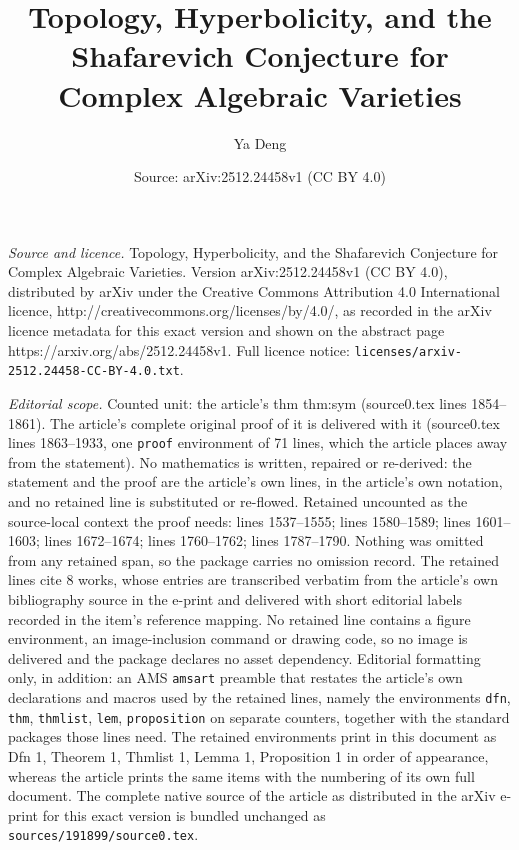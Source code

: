 \documentclass[10pt,a4paper]{amsart}
\title{Topology, Hyperbolicity, and the Shafarevich Conjecture for Complex Algebraic Varieties}
\author{Ya Deng}
\date{Source: arXiv:2512.24458v1 (CC BY 4.0)}
\begin{document}
\maketitle

\noindent\emph{Source and licence.} Topology, Hyperbolicity, and the Shafarevich Conjecture for Complex Algebraic Varieties. Version arXiv:2512.24458v1 (CC BY 4.0), distributed by arXiv under the Creative Commons Attribution 4.0 International licence, http://creativecommons.org/licenses/by/4.0/, as recorded in the arXiv licence metadata for this exact version and shown on the abstract page https://arxiv.org/abs/2512.24458v1. Full licence notice: \texttt{licenses/arxiv-2512.24458-CC-BY-4.0.txt}.\par\smallskip

\noindent\textit{Editorial scope.} Counted unit: the article's thm thm:sym (source0.tex lines 1854--1861). The article's complete original proof of it is delivered with it (source0.tex lines 1863--1933, one \texttt{proof} environment of 71 lines, which the article places away from the statement). No mathematics is written, repaired or re-derived: the statement and the proof are the article's own lines, in the article's own notation, and no retained line is substituted or re-flowed.  Retained uncounted as the source-local context the proof needs: lines 1537--1555; lines 1580--1589; lines 1601--1603; lines 1672--1674; lines 1760--1762; lines 1787--1790.  Nothing was omitted from any retained span, so the package carries no omission record.  The retained lines cite 8 works, whose entries are transcribed verbatim from the article's own bibliography source in the e-print and delivered with short editorial labels recorded in the item's reference mapping.  No retained line contains a figure environment, an image-inclusion command or drawing code, so no image is delivered and the package declares no asset dependency.  Editorial formatting only, in addition: an AMS \texttt{amsart} preamble that restates the article's own declarations and macros used by the retained lines, namely the environments \texttt{dfn}, \texttt{thm}, \texttt{thmlist}, \texttt{lem}, \texttt{proposition} on separate counters, together with the standard packages those lines need.  The retained environments print in this document as Dfn 1, Theorem 1, Thmlist 1, Lemma 1, Proposition 1 in order of appearance, whereas the article prints the same items with the numbering of its own full document.  The complete native source of the article as distributed in the arXiv e-print for this exact version is bundled unchanged as \texttt{sources/191899/source0.tex}.
\end{document}
